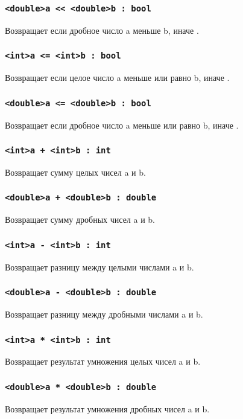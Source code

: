 \documentclass[a4paper, 14pt]{extarticle}
\begin{document}
\subsubsection{\lstinline`<double>a << <double>b : bool`}
	Возвращает  если дробное число a меньше b, иначе .

\subsubsection{\lstinline`<int>a <= <int>b : bool`}
	Возвращает  если целое число a меньше или равно b, иначе .

\subsubsection{\lstinline`<double>a <= <double>b : bool`}
	Возвращает  если дробное число a меньше или равно b, иначе .


\subsubsection{\lstinline`<int>a + <int>b : int`}
	Возвращает сумму целых чисел a и b.

\subsubsection{\lstinline`<double>a + <double>b : double`}
	Возвращает сумму дробных чисел a и b.

\subsubsection{\lstinline`<int>a - <int>b : int`}
	Возвращает разницу между целыми числами a и b.

\subsubsection{\lstinline`<double>a - <double>b : double`}
	Возвращает разницу между дробными числами a и b.

\subsubsection{\lstinline`<int>a * <int>b : int`}
	Возвращает результат умножения целых чисел a и b.

\subsubsection{\lstinline`<double>a * <double>b : double`}
	Возвращает результат умножения дробных чисел a и b.
\end{document}

